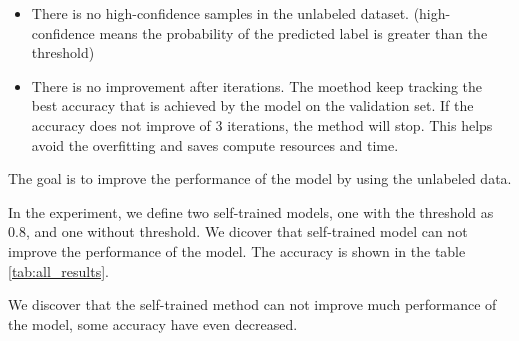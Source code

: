 \documentclass[11pt]{article}
\begin{document}
\begin{itemize}
    \item There is no high-confidence samples in the unlabeled dataset.
          (high-confidence means the probability of the predicted label is greater than the threshold)

    \item There is no improvement after iterations. 
          The moethod keep tracking the best accuracy that is achieved by the model on the validation set.
          If the accuracy does not improve of 3 iterations, the method will stop.
          This helps avoid the overfitting and saves compute resources and time.
\end{itemize}

The goal is to improve the performance of the model by using the unlabeled data.

In the experiment, we define two self-trained models, one with the threshold as 0.8, and one without threshold.
We dicover that self-trained model can not improve the performance of the model.
The accuracy is shown in the table \ref{tab:all_results}.

We discover that the self-trained method can not improve much performance of the model, 
some accuracy have even decreased.
\end{document}

